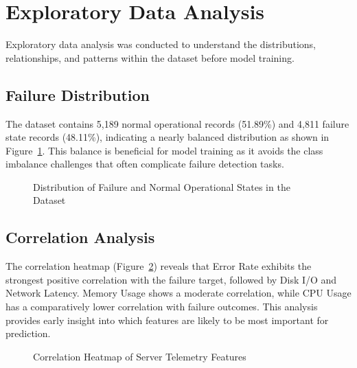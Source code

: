 \documentclass[12pt,letterpaper]{report}
\begin{document}
\section{Exploratory Data Analysis}

Exploratory data analysis was conducted to understand the distributions, relationships, and patterns within the dataset before model training.

\subsection{Failure Distribution}

The dataset contains 5,189 normal operational records (51.89\%) and 4,811 failure state records (48.11\%), indicating a nearly balanced distribution as shown in Figure~\ref{fig:failure_dist}. This balance is beneficial for model training as it avoids the class imbalance challenges that often complicate failure detection tasks.

\begin{figure}[H]
\centering
{}
\caption{Distribution of Failure and Normal Operational States in the Dataset}
\label{fig:failure_dist}
\end{figure}

\subsection{Correlation Analysis}

The correlation heatmap (Figure~\ref{fig:correlation}) reveals that Error Rate exhibits the strongest positive correlation with the failure target, followed by Disk I/O and Network Latency. Memory Usage shows a moderate correlation, while CPU Usage has a comparatively lower correlation with failure outcomes. This analysis provides early insight into which features are likely to be most important for prediction.

\begin{figure}[H]
\centering
{}
\caption{Correlation Heatmap of Server Telemetry Features}
\label{fig:correlation}
\end{figure}
\end{document}
